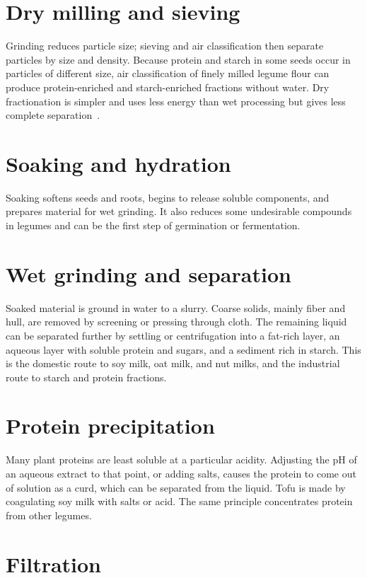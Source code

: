 \documentclass[11pt,openany]{book}
\theoremstyle{definition}
\begin{document}
\section{Dry milling and sieving}

Grinding reduces particle size; sieving and air classification then separate particles by size and density. Because protein and starch in some seeds occur in particles of different size, air classification of finely milled legume flour can produce protein-enriched and starch-enriched fractions without water. Dry fractionation is simpler and uses less energy than wet processing but gives less complete separation~\cite{schutyser2015}.

\section{Soaking and hydration}

Soaking softens seeds and roots, begins to release soluble components, and prepares material for wet grinding. It also reduces some undesirable compounds in legumes and can be the first step of germination or fermentation.

\section{Wet grinding and separation}

Soaked material is ground in water to a slurry. Coarse solids, mainly fiber and hull, are removed by screening or pressing through cloth. The remaining liquid can be separated further by settling or centrifugation into a fat-rich layer, an aqueous layer with soluble protein and sugars, and a sediment rich in starch. This is the domestic route to soy milk, oat milk, and nut milks, and the industrial route to starch and protein fractions.

\section{Protein precipitation}

Many plant proteins are least soluble at a particular acidity. Adjusting the pH of an aqueous extract to that point, or adding salts, causes the protein to come out of solution as a curd, which can be separated from the liquid. Tofu is made by coagulating soy milk with salts or acid. The same principle concentrates protein from other legumes.

\section{Filtration}
\end{document}
